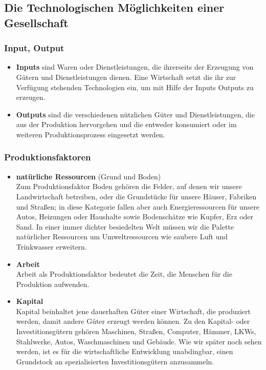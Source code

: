 \documentclass[10pt]{scrartcl}
\begin{document}
\subsection{Die Technologischen Möglichkeiten einer Gesellschaft}
\subsubsection{Input, Output}
\begin{itemize}
\item {\bf Inputs} sind Waren oder Dienstleistungen, die ihrerseits der Erzeugung von Gütern und Dienstleistungen dienen. Eine Wirtschaft setzt die ihr zur Verfügung stehenden Technologien ein, um mit Hilfe der Inputs Outputs zu erzeugen.
\item {\bf Outputs } sind die verschiedenen nützlichen Güter und Dienstleistungen, die aus der Produktion hervorgehen und die entweder konsumiert oder im weiteren Produktionsprozess eingesetzt werden.
\end{itemize} 
\subsubsection{Produktionsfaktoren}
\begin{itemize}
\item {\bf natürliche Ressourcen} (Grund und Boden)\\
Zum Produktionsfaktor Boden gehören die Felder, auf denen wir unsere Landwirtschaft betreiben, oder die Grundstücke für unsere Häuser, Fabriken und Straßen; in
diese Kategorie fallen aber auch Energieressourcen für unsere Autos, Heizungen oder Haushalte sowie Bodenschätze wie Kupfer, Erz oder Sand. In einer immer dichter besiedelten Welt müssen wir die Palette natürlicher Ressourcen um Umweltressourcen wie saubere Luft und Trinkwasser erweitern.
\item {\bf Arbeit} \\
Arbeit  als Produktionsfaktor bedeutet die Zeit, die Menschen für die Produktion aufwenden.
\item {\bf Kapital} \\
Kapital beinhaltet jene dauerhaften Güter einer Wirtschaft, die produziert werden, damit andere Güter erzeugt werden können. Zu den Kapital- oder Investitionsgütern gehören Maschinen, Straßen, Computer, Hämmer, LKWs, Stahlwerke, Autos, Waschmaschinen und Gebäude. Wie wir später noch sehen werden, ist es für die wirtschaftliche Entwicklung unabdingbar, einen Grundstock an spezialisierten Investitionsgütern anzusammeln.
\end{itemize}
\end{document}
